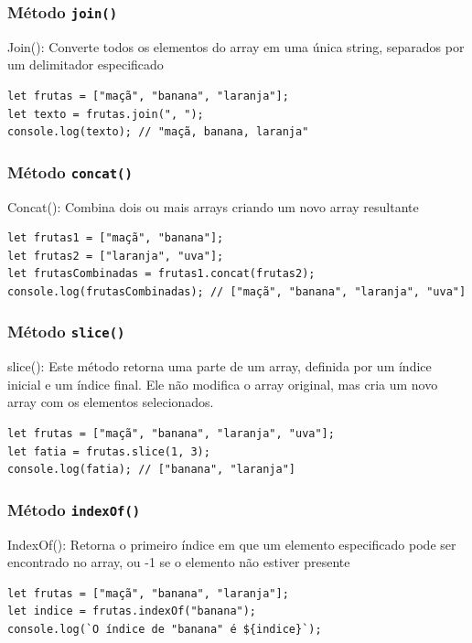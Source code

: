 \documentclass[13pt, xcolor={dvipsnames,svgnames}, portuguese]{beamer}
\begin{document}
\begin{frame}[fragile]
\frametitle{Método \texttt{join()}}
Join(): Converte todos os elementos do array em uma única string, separados por um delimitador especificado
\begin{verbatim}
let frutas = ["maçã", "banana", "laranja"];
let texto = frutas.join(", ");
console.log(texto); // "maçã, banana, laranja"
\end{verbatim}
\end{frame}


\begin{frame}[fragile]
\frametitle{Método \texttt{concat()}}
Concat(): Combina dois ou mais arrays criando um novo array resultante
\begin{verbatim}
let frutas1 = ["maçã", "banana"];
let frutas2 = ["laranja", "uva"];
let frutasCombinadas = frutas1.concat(frutas2);
console.log(frutasCombinadas); // ["maçã", "banana", "laranja", "uva"]
\end{verbatim}
\end{frame}


\begin{frame}[fragile]
\frametitle{Método \texttt{slice()}}
slice(): Este método retorna uma parte de um array, definida por um índice inicial e um índice final. Ele não modifica o array original, mas cria um novo array com os elementos selecionados.
\begin{verbatim}
let frutas = ["maçã", "banana", "laranja", "uva"];
let fatia = frutas.slice(1, 3);
console.log(fatia); // ["banana", "laranja"]
\end{verbatim}
\end{frame}


\begin{frame}[fragile]
\frametitle{Método \texttt{indexOf()}}
IndexOf(): Retorna o primeiro índice em que um elemento especificado pode ser encontrado no array, ou -1 se o elemento não estiver presente
\begin{verbatim}
let frutas = ["maçã", "banana", "laranja"];
let indice = frutas.indexOf("banana");
console.log(`O índice de "banana" é ${indice}`);
\end{verbatim}
\end{frame}




\end{document}
